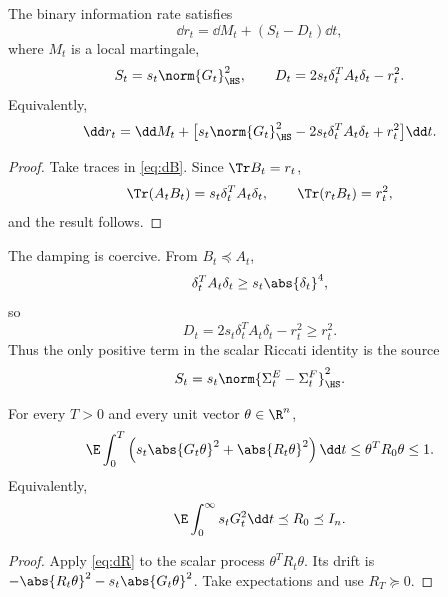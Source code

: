 \documentclass[../../main.tex]{subfiles}
\begin{document}
\begin{theorem}
\label{thm:scalar-riccati}
The binary information rate satisfies
\begin{equation}\label{eq:scalar-riccati}
  \dd r_t=\dd M_t+(S_t-D_t)\dd t,
\end{equation}
where $M_t$ is a local martingale,
\[
  S_t=s_t\norm{G_t}_{\HS}^2,
  \qquad
  D_t=2s_t\delta_t^TA_t\delta_t-r_t^2.
\]
Equivalently,
\begin{equation}\label{eq:scalar-riccati-expanded}
  \dd r_t=\dd M_t+\bigl[s_t\norm{G_t}_{\HS}^2-2s_t\delta_t^TA_t\delta_t+r_t^2\bigr]\dd t .
\end{equation}
\end{theorem}

\begin{proof}
Take traces in \eqref{eq:dB}. Since $\Tr B_t=r_t$,
\[
  \Tr(A_tB_t)=s_t\delta_t^TA_t\delta_t,
  \qquad
  \Tr(r_tB_t)=r_t^2,
\]
and the result follows.
\end{proof}

The damping is coercive. From $B_t\preceq A_t$,
\[
  \delta_t^TA_t\delta_t\ge s_t\abs{\delta_t}^4,
\]
so
\begin{equation}\label{eq:D-ge-r2}
  D_t=2s_t\delta_t^TA_t\delta_t-r_t^2\ge r_t^2 .
\end{equation}
Thus the only positive term in the scalar Riccati identity is the source
\[
  S_t=s_t\norm{\Sigma_t^E-\Sigma_t^F}_{\HS}^2.
\]

\begin{corollary}
\label{cor:per-direction}
For every $T>0$ and every unit vector $\theta\in\R^n$,
\begin{equation}\label{eq:per-direction}
  \E\int_0^T\left(s_t\abs{G_t\theta}^2+\abs{R_t\theta}^2\right)\dd t
  \le \theta^TR_0\theta\le1.
\end{equation}
Equivalently,
\begin{equation}\label{eq:loewner-carleson}
  \E\int_0^\infty s_tG_t^2\dd t\preceq R_0\preceq I_n.
\end{equation}
\end{corollary}

\begin{proof}
Apply \eqref{eq:dR} to the scalar process $\theta^TR_t\theta$. Its drift is
$-\abs{R_t\theta}^2-s_t\abs{G_t\theta}^2$. Take expectations and use $R_T\succeq0$.
\end{proof}
\end{document}

